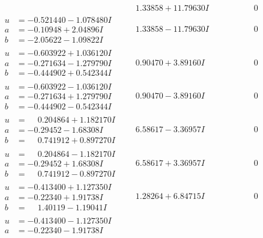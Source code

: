 \documentclass[1p]{elsarticle_modified}
\theoremstyle{definition}
\begin{document}
$$\begin{array}{c|c|c}
 & \phantom{-}1.33858 + 11.79630 I & \phantom{-0.000000 } 0 \\ \hline\begin{aligned}
u &= -0.521440 - 1.078480 I \\
a &= -0.10948 + 2.04896 I \\
b &= -2.05622 - 1.09822 I\end{aligned}
 & \phantom{-}1.33858 - 11.79630 I & \phantom{-0.000000 } 0 \\ \hline\begin{aligned}
u &= -0.603922 + 1.036120 I \\
a &= -0.271634 - 1.279790 I \\
b &= -0.444902 + 0.542344 I\end{aligned}
 & \phantom{-}0.90470 + 3.89160 I & \phantom{-0.000000 } 0 \\ \hline\begin{aligned}
u &= -0.603922 - 1.036120 I \\
a &= -0.271634 + 1.279790 I \\
b &= -0.444902 - 0.542344 I\end{aligned}
 & \phantom{-}0.90470 - 3.89160 I & \phantom{-0.000000 } 0 \\ \hline\begin{aligned}
u &= \phantom{-}0.204864 + 1.182170 I \\
a &= -0.29452 - 1.68308 I \\
b &= \phantom{-}0.741912 + 0.897270 I\end{aligned}
 & \phantom{-}6.58617 - 3.36957 I & \phantom{-0.000000 } 0 \\ \hline\begin{aligned}
u &= \phantom{-}0.204864 - 1.182170 I \\
a &= -0.29452 + 1.68308 I \\
b &= \phantom{-}0.741912 - 0.897270 I\end{aligned}
 & \phantom{-}6.58617 + 3.36957 I & \phantom{-0.000000 } 0 \\ \hline\begin{aligned}
u &= -0.413400 + 1.127350 I \\
a &= -0.22340 + 1.91738 I \\
b &= \phantom{-}1.40119 - 1.19041 I\end{aligned}
 & \phantom{-}1.28264 + 6.84715 I & \phantom{-0.000000 } 0 \\ \hline\begin{aligned}
u &= -0.413400 - 1.127350 I \\
a &= -0.22340 - 1.91738 I \\

\end{aligned}
\end{array}$$
\end{document}
